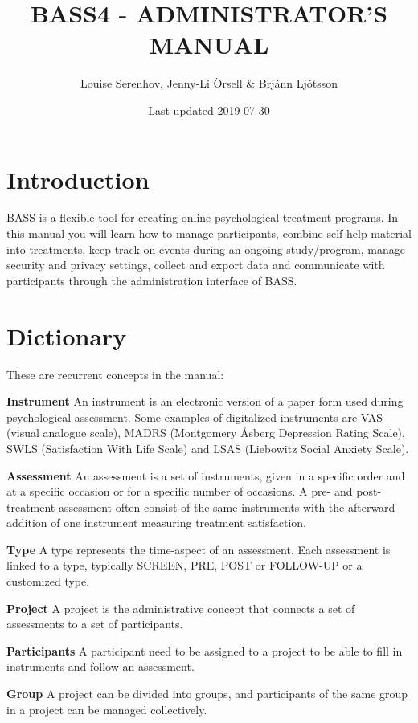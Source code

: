 \documentclass[]{book}
\title{BASS4 - ADMINISTRATOR'S MANUAL}
\author{Louise Serenhov, Jenny-Li Örsell \& Brjánn Ljótsson}
\date{Last updated 2019-07-30}
\begin{document}
\maketitle

{
\setcounter{tocdepth}{1}
\tableofcontents
}
\hypertarget{introduction}{%
\chapter{Introduction}\label{introduction}}

BASS is a flexible tool for creating online psychological treatment programs.
In this manual you will learn how to manage participants, combine self-help material into treatments, keep track on events during an ongoing study/program, manage security and privacy settings, collect and export data and communicate with participants through the administration interface of BASS.

\hypertarget{dictionary}{%
\chapter{Dictionary}\label{dictionary}}

These are recurrent concepts in the manual:

\textbf{Instrument}
An instrument is an electronic version of a paper form used during psychological assessment. Some examples of digitalized instruments are VAS (visual analogue scale), MADRS (Montgomery Åsberg Depression Rating Scale), SWLS (Satisfaction With Life Scale) and LSAS (Liebowitz Social Anxiety Scale).

\textbf{Assessment}
An assessment is a set of instruments, given in a specific order and at a specific occasion or for a specific number of occasions. A pre- and post-treatment assessment often consist of the same instruments with the afterward addition of one instrument measuring treatment satisfaction.

\textbf{Type}
A type represents the time-aspect of an assessment. Each assessment is linked to a type, typically SCREEN, PRE, POST or FOLLOW-UP or a customized type.

\textbf{Project}
A project is the administrative concept that connects a set of assessments to a set of participants.

\textbf{Participants}
A participant need to be assigned to a project to be able to fill in instruments and follow an assessment.

\textbf{Group}
A project can be divided into groups, and participants of the same group in a project can be managed collectively.
\end{document}
